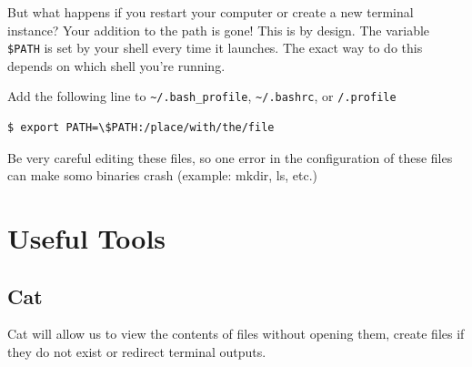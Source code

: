 \documentclass{article}
\newenvironment{blocktemplateIII}[1]{%
    \tcolorbox[beamer,%
    noparskip,breakable,
    ,colframe=Red,%
    colbacklower=LimeGreen!75!LightGreen,%
    title=#1]}%
    {\endtcolorbox}
\newenvironment{codetemplate}[1][]{%
  \mybasecolorbox[#1]
  \itshape
}{%
  \endmybasecolorbox
}
\begin{document}
But what happens if you restart your computer or create a new terminal instance? Your addition to the path is gone! This is by design. The variable \verb|$PATH| is set by your shell every time it launches. The exact way to do this depends on which shell you're running.

Add the following line to \verb|~/.bash_profile|, \verb|~/.bashrc|, or \verb|/.profile|

\begin{codetemplate}{}
\begin{verbatim}
$ export PATH=\$PATH:/place/with/the/file
\end{verbatim}
\end{codetemplate}

\begin{blocktemplateIII}{Nota}
Be very careful editing these files, so one error in the configuration of these files can make somo binaries crash (example: mkdir, ls, etc.)
\end{blocktemplateIII}

\newpage
\section{Useful Tools}

\subsection{Cat}
Cat will allow us to view the contents of files without opening them, create files if they do not exist or redirect terminal outputs.
\end{document}
